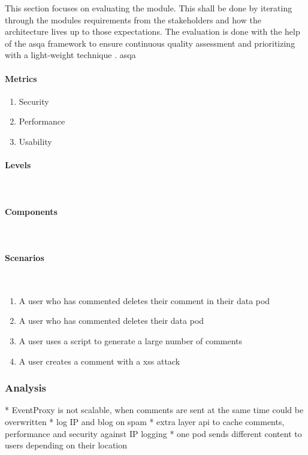 This section focuses on evaluating the module. This shall be done by iterating through the modules requirements from the stakeholders and how the architecture lives up to those expectations. The evaluation is done with the help of the \gls{asqa} framework to ensure continuous quality assessment and prioritizing with a light-weight technique \cite{asqa-paper}.
\gls{asqa} 

\paragraph{Metrics}

\begin{enumerate}
    \item Security
    \item Performance
    \item Usability
\end{enumerate}

\paragraph{Levels}\mbox{}\\



\paragraph{Components}\mbox{}\\

\paragraph{Scenarios}\mbox{}\\

\begin{enumerate}
    \item A user who has commented deletes their comment in their data pod
    \item A user who has commented deletes their data pod
    \item A user uses a script to generate a large number of comments
    \item A user creates a comment with a \gls{xss} attack
\end{enumerate}


\subsubsection{Analysis}

* EventProxy is not scalable, when comments are sent at the same time could be overwritten
* log IP and blog on spam
* extra layer api to cache comments, performance and security against IP logging
* one pod sends different content to users depending on their location
